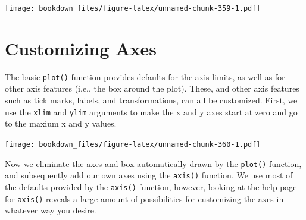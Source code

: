 \documentclass[
]{krantz}
\makeatletter
\newenvironment{Shaded}{\begin{snugshade}}{\end{snugshade}}
\newcommand{\DataTypeTok}[1]{\textcolor[rgb]{0.27,0.27,0.27}{#1}}
\newcommand{\DecValTok}[1]{\textcolor[rgb]{0.06,0.06,0.06}{#1}}
\newcommand{\KeywordTok}[1]{\textcolor[rgb]{0.27,0.27,0.27}{\textbf{#1}}}
\newcommand{\NormalTok}[1]{#1}
\newcommand{\OperatorTok}[1]{\textcolor[rgb]{0.43,0.43,0.43}{\textbf{#1}}}
\newcommand{\StringTok}[1]{\textcolor[rgb]{0.5,0.5,0.5}{#1}}
\newenvironment{kframe}{%
\medskip{}
\setlength{\fboxsep}{.8em}
 \def\at@end@of@kframe{}%
 \ifinner\ifhmode%
  \def\at@end@of@kframe{\end{minipage}}%
  \begin{minipage}{\columnwidth}%
 \fi\fi%
 \def\FrameCommand##1{\hskip\@totalleftmargin \hskip-\fboxsep
 \colorbox{shadecolor}{##1}\hskip-\fboxsep
     \hskip-\linewidth \hskip-\@totalleftmargin \hskip\columnwidth}%
 \MakeFramed {\advance\hsize-\width
   \@totalleftmargin\z@ \linewidth\hsize
   \@setminipage}}%
 {\par\unskip\endMakeFramed%
 \at@end@of@kframe}
\renewenvironment{Shaded}{\begin{kframe}}{\end{kframe}}
\makeatother
\begin{document}
\texttt{[image: bookdown\_files/figure-latex/unnamed-chunk-359-1.pdf]}

\hypertarget{graphics5}{%
\section{Customizing Axes}\label{graphics5}}

The basic \texttt{plot()} function provides defaults for the axis limits, as well as for other axis features (i.e., the box around the plot). These, and other axis features such as tick marks, labels, and transformations, can all be customized. First, we use the \texttt{xlim} and \texttt{ylim} arguments to make the x and y axes start at zero and go to the maxium x and y values.

\begin{Shaded}
\end{Shaded}

\texttt{[image: bookdown\_files/figure-latex/unnamed-chunk-360-1.pdf]}

Now we eliminate the axes and box automatically drawn by the \texttt{plot()} function, and subsequently add our own axes using the \texttt{axis()} function. We use most of the defaults provided by the \texttt{axis()} function, however, looking at the help page for \texttt{axis()} reveals a large amount of possibilities for customizing the axes in whatever way you desire.
\end{document}
